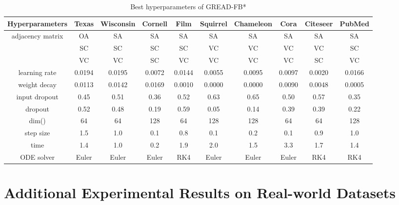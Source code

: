 \documentclass{article}
\theoremstyle{plain}
\theoremstyle{definition}
\theoremstyle{remark}
\begin{document}
\begin{table*}[ht!]
    \centering
    \small
    \caption{Best hyperparameters of GREAD-FB*}
    \label{tab:best_FB3}
    \begin{tabular}{c ccccccccc} \toprule
        Hyperparameters  & Texas  & Wisconsin 
                                          & Cornell& Film   & Squirrel 
                                                                      & Chameleon
                                                                               & Cora   & Citeseer 
                                                                                                 & PubMed\\ \midrule
        adjacency matrix & OA     & SA     & SA     & SA     & SA     & SA     & SA     & SA     & SA    \\
                 & SC     & SC     & SC     & SC     & VC     & VC     & VC     & VC     & SC    \\
                  & VC     & VC     & SC     & VC     & VC     & VC     & VC     & SC     & VC    \\
        learning rate    & 0.0194 & 0.0195 & 0.0072 & 0.0144 & 0.0055 & 0.0095 & 0.0097 & 0.0020 & 0.0166\\
        weight decay     & 0.0113 & 0.0142 & 0.0169 & 0.0010 & 0.0000 & 0.0000 & 0.0090 & 0.0048 & 0.0005\\
        input dropout    & 0.45   & 0.51   & 0.36   & 0.52   & 0.63   & 0.65   & 0.50   & 0.57   & 0.35  \\
        dropout          & 0.52   & 0.48   & 0.19   & 0.59   & 0.05   & 0.14   & 0.39   & 0.39   & 0.22  \\
        dim()& 64     & 64     & 128    & 64     & 128    & 128    & 64     & 64     & 128   \\
        step size  & 1.5    & 1.0    & 0.1    & 0.8    & 0.1    & 0.2    & 0.1    & 0.9    & 1.0   \\
        time          & 1.4    & 1.0    & 0.2    & 1.9    & 2.0    & 1.5    & 3.3    & 1.7    & 1.4  \\
        ODE solver       & Euler  & Euler  & Euler  & RK4    & Euler  & Euler  & Euler  & RK4    & RK4   \\
        \bottomrule
    \end{tabular}
\end{table*}

\clearpage

\section{Additional Experimental Results on Real-world Datasets}\label{a:add_exp}
\end{document}
